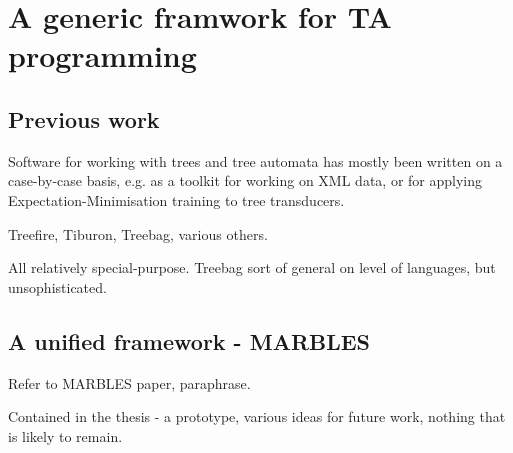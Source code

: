 \section{A generic framwork for TA programming}

\subsection{Previous work}

Software for working with trees and tree automata has mostly been written
on a case-by-case basis, e.g. as a toolkit for working on XML data, or
for applying Expectation-Minimisation training to tree transducers.



Treefire, Tiburon, Treebag, various others.

All relatively special-purpose. Treebag sort of general on level of
languages, but unsophisticated.

\subsection{A unified framework - MARBLES}

Refer to MARBLES paper, paraphrase.

Contained in the thesis - a prototype, various ideas for future work,
nothing that is likely to remain.
